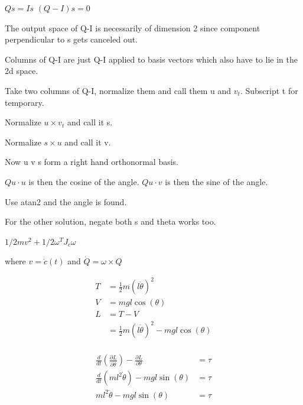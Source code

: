 \begin{solutionbox}[Q1-3]
    $Qs = Is$
    $(Q-I)s = 0$

    The output space of Q-I is necessarily of dimension 2 since component perpendicular to s gets canceled out.

    Columns of Q-I are just Q-I applied to basis vectors which also have to lie in the 2d space.

    Take two columns of Q-I, normalize them and call them u and $v_t$. Subscript t for temporary.

    Normalize $u \times v_t$ and call it s.

    Normalize $s \times u$ and call it v.

    Now u v s form a right hand orthonormal basis.

    $Q u \cdot u$ is then the cosine of the angle.
    $Q u \cdot v$ is then the sine of the angle.

    Use atan2 and the angle is found.

    For the other solution, negate both s and theta works too.
\end{solutionbox}

\begin{solutionbox}[Q1-4]

    $1/2 mv^2 + 1/2 \omega^{T} J_c \omega$

    where $v=\dot{c}(t)$ and $\dot{Q}=\omega\times Q$

\end{solutionbox}

\begin{solutionbox}[Q1-5]
    \begin{align*}
        T & =\frac{1}{2} m \left(l\dot{\theta}\right)^2                 \\
        V & = mgl\cos(\theta)                                           \\
        L & =T-V                                                        \\
          & =\frac{1}{2} m \left(l\dot{\theta}\right)^2-mgl\cos(\theta) \\
    \end{align*}

    \begin{align*}
        \frac{d}{dt} \left( \frac{\partial L}{\partial \dot{\theta}} \right) - \frac{\partial L}{\partial \theta} & = \tau \\
        \frac{d}{dt} \left( ml^2\dot{\theta} \right) - mgl\sin(\theta)                                            & = \tau \\
        ml^2\ddot{\theta} - mgl\sin(\theta)                                                                       & = \tau \\
    \end{align*}
\end{solutionbox}


